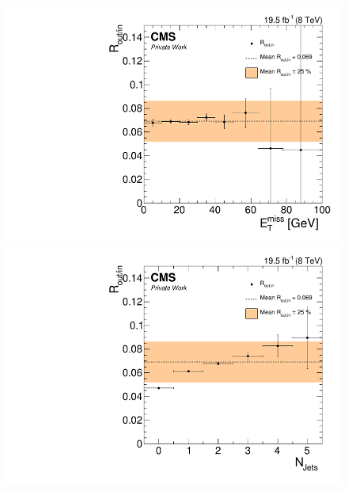 \begin{figure}[htbp]
\centering
\begin{minipage}[t]{0.49\textwidth}
  \includegraphics[width=\textwidth]{plots/BG/rOutIn/rOutInSyst_DrellYanControlCentral_Full2012_MET_LowMass_EE_None.pdf}
\end{minipage}
\begin{minipage}[t]{0.49\textwidth}
\includegraphics[width=\textwidth]{plots/BG/rOutIn/rOutInSyst_DrellYanControlCentral_Full2012_NJets_LowMass_EE_None.pdf}
\end{minipage}
\begin{minipage}[t]{0.49\textwidth}

\end{minipage}
\end{figure}
